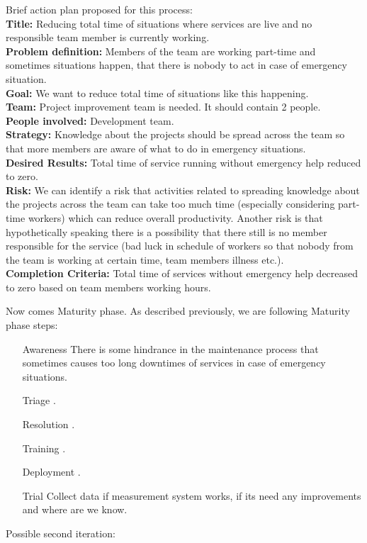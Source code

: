 Brief action plan proposed for this process: \\
\textbf{Title:} Reducing total time of situations where services are live and no responsible team member is currently working.\\
\textbf{Problem definition:} Members of the team are working part-time and sometimes situations happen, that there is nobody to act in case of emergency situation.\\
\textbf{Goal:}  We want to reduce total time of situations like this happening.\\
\textbf{Team:} Project improvement team is needed. It should contain 2 people.\\
\textbf{People involved:} Development team.\\
\textbf{Strategy:} Knowledge about the projects should be spread across the team so that more members are aware of what to do in emergency situations.\\
\textbf{Desired Results:} Total time of service running without emergency help reduced to zero.\\
\textbf{Risk:} We can identify a risk that activities related to spreading knowledge about the projects across the team can take too much time (especially considering part-time workers) which can reduce overall productivity. Another risk is that hypothetically speaking there is a possibility that there still is no member responsible for the service (bad luck in schedule of workers so that nobody from the team is working at certain time, team members illness etc.).\\
\textbf{Completion Criteria:} Total time of services without emergency help decreased to zero based on team members working hours.

Now comes Maturity phase. As described previously, we are following Maturity phase steps:
\begin{enumerate}
\item[Awareness] There is some hindrance in the maintenance process that sometimes causes too long downtimes of services in case of emergency situations. 
\item[Triage] .
\item[Resolution] .
\item[Training] .
\item[Deployment] .
\item[Trial] Collect data if measurement system works, if its need any improvements and where are we know.
\end{enumerate}

Possible second iteration:
